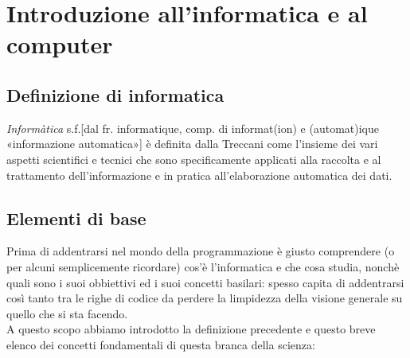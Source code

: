 \chapter{Introduzione all'informatica e al computer}
\section{Definizione di informatica}
\textit{Informàtica} s.f.[dal fr. informatique, comp. di informat(ion) e (automat)ique «informazione automatica»] è definita dalla Treccani come l’insieme dei vari aspetti scientifici e tecnici che sono specificamente applicati alla raccolta e al trattamento dell’informazione e in pratica all’elaborazione automatica dei dati.

\section{Elementi di base}
Prima di addentrarsi nel mondo della programmazione è giusto comprendere (o per alcuni semplicemente ricordare) cos'è l'informatica e che cosa studia, nonchè quali sono i suoi obbiettivi ed i suoi concetti basilari: spesso capita di addentrarsi così tanto tra le righe di codice da perdere la limpidezza della visione generale su quello che si sta facendo.\\ 
A questo scopo abbiamo introdotto la definizione precedente e questo breve elenco dei concetti fondamentali di questa branca della scienza:

